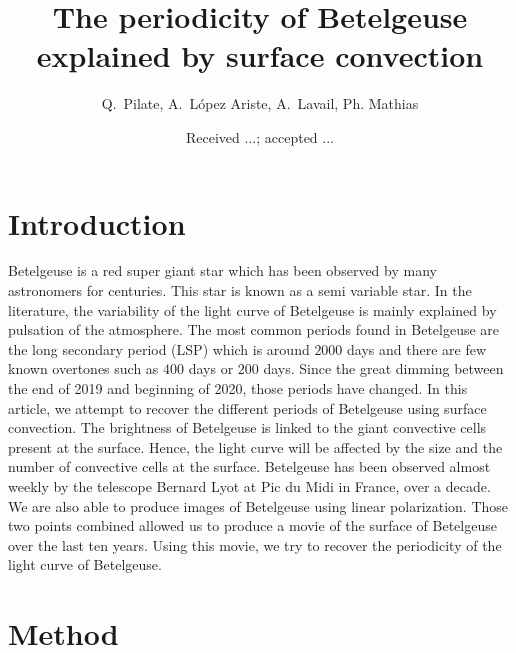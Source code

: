 \documentclass{aa}
\begin{document}
 


   \title{The periodicity of Betelgeuse explained by surface convection}


    \author{{ Q.~Pilate},{ A.~L{\'o}pez Ariste},{ A.~Lavail},{ Ph. Mathias} }


   \date{Received ...; accepted ...}

 
  \abstract


   \keywords{
               }

   \maketitle
%

\section{Introduction}
Betelgeuse is a red super giant star which has been observed by many astronomers for centuries. This star is known as a semi variable star. In the literature, the variability of the light curve of Betelgeuse is mainly explained by pulsation of the atmosphere. The most common periods found in Betelgeuse are the long secondary period (LSP) which is around $2000$ days and there are few known overtones such as $400$ days or $200$ days. Since the great dimming between the end of 2019 and beginning of 2020, those periods have changed. In this article, we attempt to recover the different periods of Betelgeuse using surface convection. The brightness of Betelgeuse is linked to the giant convective cells present at the surface. Hence, the light curve will be affected by the size and the number of convective cells at the surface. Betelgeuse has been observed almost weekly by the telescope Bernard Lyot at Pic du Midi in France, over a decade. We are also able to produce images of Betelgeuse using linear polarization. Those two points combined allowed us to produce a movie of the surface of Betelgeuse over the last ten years. Using this movie, we try to recover the periodicity of the light curve of Betelgeuse. 

\section{Method}
\end{document}
